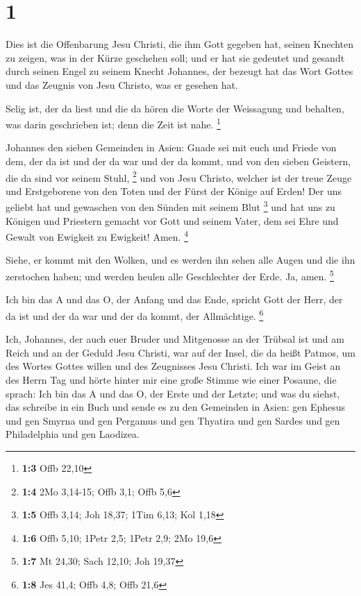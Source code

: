 \hypertarget{section}{%
\section{1}\label{section}}

 Dies ist die Offenbarung Jesu Christi, die ihm Gott gegeben
hat, seinen Knechten zu zeigen, was in der Kürze geschehen soll; und er
hat sie gedeutet und gesandt durch seinen Engel zu seinem Knecht
Johannes,  der bezeugt hat das Wort Gottes und das Zeugnis
von Jesu Christo, was er gesehen hat.

 Selig ist, der da liest und die da hören die Worte der
Weissagung und behalten, was darin geschrieben ist; denn die Zeit ist
nahe. \footnote{\textbf{1:3} Offb 22,10}

 Johannes den sieben Gemeinden in Asien: Gnade sei mit euch
und Friede von dem, der da ist und der da war und der da kommt, und von
den sieben Geistern, die da sind vor seinem Stuhl, \footnote{\textbf{1:4}
  2Mo 3,14-15; Offb 3,1; Offb 5,6}  und von Jesu Christo,
welcher ist der treue Zeuge und Erstgeborene von den Toten und der Fürst
der Könige auf Erden! Der uns geliebt hat und gewaschen von den Sünden
mit seinem Blut \footnote{\textbf{1:5} Offb 3,14; Joh 18,37; 1Tim 6,13;
  Kol 1,18}  und hat uns zu Königen und Priestern gemacht
vor Gott und seinem Vater, dem sei Ehre und Gewalt von Ewigkeit zu
Ewigkeit! Amen. \footnote{\textbf{1:6} Offb 5,10; 1Petr 2,5; 1Petr 2,9;
  2Mo 19,6}

 Siehe, er kommt mit den Wolken, und es werden ihn sehen
alle Augen und die ihn zerstochen haben; und werden heulen alle
Geschlechter der Erde. Ja, amen. \footnote{\textbf{1:7} Mt 24,30; Sach
  12,10; Joh 19,37}

 Ich bin das A und das O, der Anfang und das Ende, spricht
Gott der Herr, der da ist und der da war und der da kommt, der
Allmächtige. \footnote{\textbf{1:8} Jes 41,4; Offb 4,8; Offb 21,6}

 Ich, Johannes, der auch euer Bruder und Mitgenosse an der
Trübsal ist und am Reich und an der Geduld Jesu Christi, war auf der
Insel, die da heißt Patmos, um des Wortes Gottes willen und des
Zeugnisses Jesu Christi.  Ich war im Geist an des Herrn Tag
und hörte hinter mir eine große Stimme wie einer Posaune, 
die sprach: Ich bin das A und das O, der Erste und der Letzte; und was
du siehst, das schreibe in ein Buch und sende es zu den Gemeinden in
Asien: gen Ephesus und gen Smyrna und gen Pergamus und gen Thyatira und
gen Sardes und gen Philadelphia und gen Laodizea.

